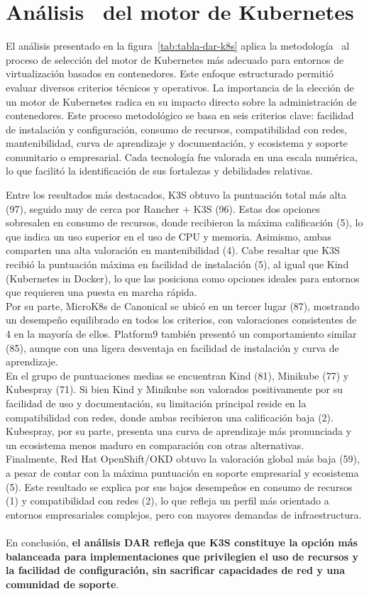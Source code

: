 \section{Análisis \DAR\ del motor de Kubernetes}
\noindent
El análisis presentado en la figura~\ref{tab:tabla-dar-k8s} aplica la metodología \DAR\ al proceso de selección del motor de Kubernetes más adecuado para entornos de virtualización basados en contenedores. Este enfoque estructurado permitió evaluar diversos criterios técnicos y operativos. La importancia de la elección de un motor de Kubernetes radica en su impacto directo sobre la administración de contenedores. Este proceso metodológico se basa en seis criterios clave: facilidad de instalación y configuración, consumo de recursos, compatibilidad con redes, mantenibilidad, curva de aprendizaje y documentación, y ecosistema y soporte comunitario o empresarial. Cada tecnología fue valorada en una escala numérica, lo que facilitó la identificación de sus fortalezas y debilidades relativas.

Entre los resultados más destacados, K3S obtuvo la puntuación total más alta (97), seguido muy de cerca por Rancher + K3S (96). Estas dos opciones sobresalen en consumo de recursos, donde recibieron la máxima calificación (5), lo que indica un uso superior en el uso de CPU y memoria. Asimismo, ambas comparten una alta valoración en mantenibilidad (4). Cabe resaltar que K3S recibió la puntuación máxima en facilidad de instalación (5), al igual que Kind (Kubernetes in Docker), lo que las posiciona como opciones ideales para entornos que requieren una puesta en marcha rápida.\\
Por su parte, MicroK8s de Canonical se ubicó en un tercer lugar (87), mostrando un desempeño equilibrado en todos los criterios, con valoraciones consistentes de 4 en la mayoría de ellos. Platform9 también presentó un comportamiento similar (85), aunque con una ligera desventaja en facilidad de instalación y curva de aprendizaje.\\
En el grupo de puntuaciones medias se encuentran Kind (81), Minikube (77) y Kubespray (71). Si bien Kind y Minikube son valorados positivamente por su facilidad de uso y documentación, su limitación principal reside en la compatibilidad con redes, donde ambas recibieron una calificación baja (2). Kubespray, por su parte, presenta una curva de aprendizaje más pronunciada y un ecosistema menos maduro en comparación con otras alternativas.\\
Finalmente, Red Hat OpenShift/OKD obtuvo la valoración global más baja (59), a pesar de contar con la máxima puntuación en soporte empresarial y ecosistema (5). Este resultado se explica por sus bajos desempeños en consumo de recursos (1) y compatibilidad con redes (2), lo que refleja un perfil más orientado a entornos empresariales complejos, pero con mayores demandas de infraestructura.\\ \\
En conclusión, \textbf{el análisis DAR refleja que K3S constituye la opción más balanceada para implementaciones que privilegien el uso de recursos y la facilidad de configuración, sin sacrificar capacidades de red y una comunidad de soporte}.